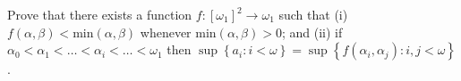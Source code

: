 Prove that there exists a function $f\colon [\omega_1]^2 \rightarrow \omega _1$ such that
(i) $f(\alpha, \beta)< \mathrm{min}(\alpha, \beta)$ whenever $\mathrm{min}(\alpha,\beta)>0$; and
(ii) if $\alpha_0<\alpha_1<\ldots<\alpha_i<\ldots<\omega_1$ then $\sup\left\{ a_i \colon i<\omega \right\} =\sup \left\{ f(\alpha_i, \alpha_j)\colon i,j<\omega\right\}$.
